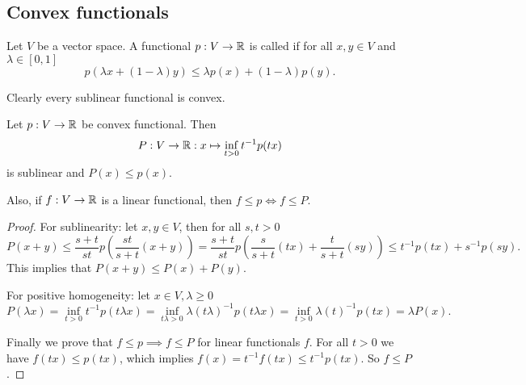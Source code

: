 \subsection{Convex functionals}
\begin{definition}
Let $V$ be a vector space. A functional $p:V\to \mathbb{R}$ is called  if for all $x,y\in V$ and $\lambda\in [0,1]$
\[ p(\lambda x + (1-\lambda)y) \leq \lambda p(x) + (1-\lambda)p(y). \]
\end{definition}
Clearly every sublinear functional is convex.

\begin{lemma}
Let $p: V\to\mathbb{R}$ be convex functional. Then
\[ P: V\to\mathbb{R}: x\mapsto \inf_{t>0} t^{-1}p(tx) \]
is sublinear and $P(x)\leq p(x)$.

Also, if $f:V\to \mathbb{R}$ is a linear functional, then $f\leq p \iff f\leq P$.
\end{lemma}
\begin{proof}
For sublinearity: let $x,y\in V$, then for all $s,t>0$
\[ P(x+y) \leq \frac{s+t}{st}p\left(\frac{st}{s+t}(x+y)\right) = \frac{s+t}{st}p\left(\frac{s}{s+t}(tx)+\frac{t}{s+t}(sy)\right) \leq t^{-1}p(tx) + s^{-1}p(sy). \]
This implies that $P(x+y)\leq P(x)+P(y)$.

For positive homogeneity: let $x\in V,\lambda\geq 0$
\[ P(\lambda x) = \inf_{t>0} t^{-1}p(t\lambda x) = \inf_{t\lambda>0} \lambda (t\lambda)^{-1}p(t\lambda x) = \inf_{t>0} \lambda (t)^{-1}p(tx) = \lambda P(x). \]

Finally we prove that $f\leq p \implies f\leq P$ for linear functionals $f$. For all $t>0$ we have $f(tx) \leq p(tx)$, which implies $f(x) = t^{-1}f(tx) \leq t^{-1}p(tx)$. So $f\leq P$.
\end{proof}

